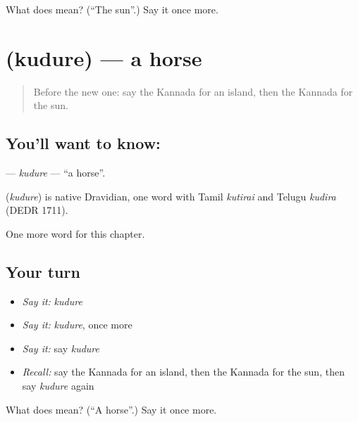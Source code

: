\begin{tcolorbox}[breakable,colback=teal!4,colframe=teal!35!black,title={Before you move on}]
What does  mean? (\textquotedblleft{}The sun\textquotedblright{}.) Say it once more.
\end{tcolorbox}
\section[\texorpdfstring{\kn{ಕುದುರೆ} (kudure)}{ಕುದುರೆ (kudure)}]{ (kudure) — a horse}

\label{lesson:KA-C129-kudure}



\begin{quote}
Before the new one: say the Kannada for an island, then the Kannada for the sun.
\end{quote}

\subsection*{You'll want to know: }
\textbf{} — \emph{kudure} — \textquotedblleft{}a horse\textquotedblright{}.

\begin{cousinweb}
\textbf{} (\emph{kudure}) is native Dravidian, one word with Tamil \emph{kutirai} and Telugu \emph{kudira} (DEDR 1711).
\end{cousinweb}

\begin{grammarlens}[title={What you've built}]
One more word for this chapter.
\end{grammarlens}

\subsection*{Your turn}
\begin{itemize}
\raggedright
  \item \emph{Say it:} \emph{kudure}
  \item \emph{Say it:} \emph{kudure}, once more
  \item \emph{Say it:} say \emph{kudure}
  \item \emph{Recall:} say the Kannada for an island, then the Kannada for the sun, then say \emph{kudure} again
\end{itemize}

\begin{tcolorbox}[breakable,colback=teal!4,colframe=teal!35!black,title={Before you move on}]
What does  mean? (\textquotedblleft{}A horse\textquotedblright{}.) Say it once more.
\end{tcolorbox}
